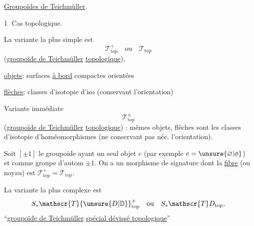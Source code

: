 \uline{Groupoïdes de Teichmüller}.

\textcircled{1} Cas topologique.

La variante la plus simple est
\[
\mathscr{T}_{\mathrm{top}}^{+}\quad\text{ou}\quad \mathscr{T}_{\mathrm{top}}
\]
(\uline{groupoïde de Teichmüller}  \uline{topologique}),

\uline{objets}: surfaces \uline{à bord} compactes orientées

\uline{flèches}: classes d'isotopie d'iso (conservant l'orientation)

Variante immédiate
\[
\mathscr{T}_{\mathrm{top}}^{\pm}
\]
(\uline{groupoïde de Teichmüller}  \uline{topologique}) :
mêmes objets, flèches sont les classes d'isotopie d'homéomorphismes (ne conservant pas néc. l'orientation).

Soit $[\pm1]$ le groupoïde ayant un seul objet $e$ (par exemple $e=\unsure{\varnothing|\phi}$) et comme groupe d'autom $\pm1$. On a un morphisme de signature
dont la \uline{fibre}  (ou noyau) est $\mathscr{T}_{\mathrm{top}}^{+}=\mathscr{T}_{\mathrm{top}}$.

La variante la plus complexe est
\[
S_{*}\mathscr{T}{\unsure{D|\mathbb D}}_{\mathrm{top}}^{+}\quad\text{ou}\quad S_{*}\mathscr{T}D_{\mathrm{top}},
\]
``\uline{groupoïde de Teichmüller}  \uline{spécial dévissé topologique}''


